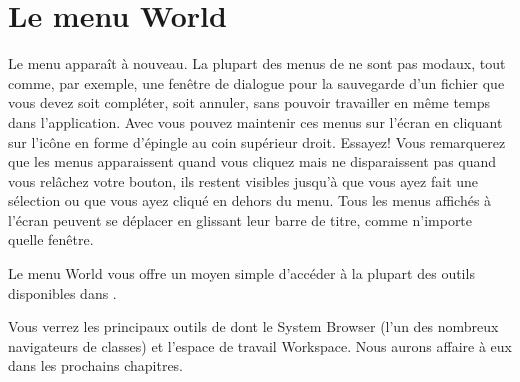 \documentclass[a4paper,10pt,twoside]{book}
\begin{document}
\section{Le menu World}

Le menu  apparaît à nouveau.
La plupart des menus de \sq ne sont pas modaux, tout comme, par
exemple, une fenêtre de dialogue pour la sauvegarde d'un fichier que
vous devez soit compléter, soit annuler, sans pouvoir travailler en même temps dans l'application. 
Avec \sq vous pouvez maintenir ces menus sur l'écran en cliquant sur
l'icône en forme d'épingle au coin supérieur droit. Essayez! Vous
remarquerez que les menus apparaissent  quand  vous cliquez  mais ne
disparaissent pas quand vous relâchez votre bouton, ils restent
visibles jusqu'à que vous ayez fait une sélection ou que vous ayez
cliqué en dehors du menu. Tous les menus affichés à l'écran peuvent se déplacer en glissant leur barre de titre, comme n'importe quelle fenêtre.

Le menu World vous offre un moyen simple d'accéder à la plupart des
outils disponibles dans \sq.

Vous verrez  les principaux outils de \sq dont le System Browser (l'un
des nombreux navigateurs de classes) et l'espace de travail
Workspace. Nous aurons affaire à eux dans les prochains chapitres.
\end{document}
